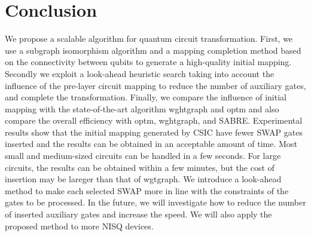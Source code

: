 \documentclass[runningheads]{llncs}
\begin{document}
\section{Conclusion}
\label{Conclusion}
We propose a scalable algorithm for quantum circuit transformation. First, we use a subgraph isomorphism algorithm and a mapping completion method based on the connectivity between qubits to generate a high-quality initial mapping. Secondly we exploit a look-ahead heuristic search taking into account the influence of the pre-layer circuit mapping to reduce the number of auxiliary gates, and complete the transformation. Finally, we compare the influence of initial mapping  with the state-of-the-art algorithm wghtgraph and optm and also compare the overall efficiency with optm, wghtgraph, and SABRE.
Experimental results show that the initial mapping generated by CSIC have fewer SWAP gates inserted and the results can be obtained in an acceptable amount of time. Most small and medium-sized circuits can be handled in a few seconds.
For large circuits, the results can be obtained within a few minutes,
but the cost of insertion may be lareger than that of wgtgraph.
We introduce a look-ahead method to make each selected SWAP more in line with the constraints of the gates to be processed.
In the future, we will investigate how to reduce the number of inserted auxiliary gates  and increase the speed. We will also apply the proposed method to more NISQ devices.





\newpage
\appendix
\end{document}
